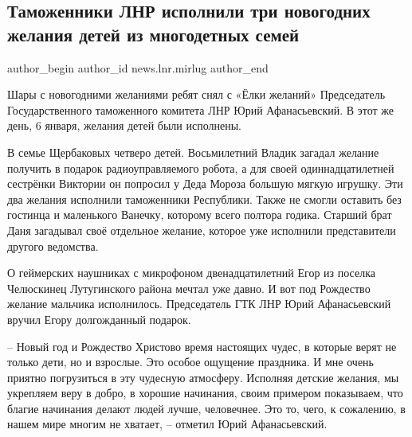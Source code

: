  
 
 
 
 
\subsection{Таможенники ЛНР исполнили три новогодних желания детей из многодетных семей}
\label{sec:06_01_2022.stz.news.lnr.mirlug.1.tamozhenniki_jolka_zhelanij}

\ifcmt
 author_begin
   author_id news.lnr.mirlug
 author_end
\fi

Шары с новогодними желаниями ребят снял с «Ёлки желаний» Председатель
Государственного таможенного комитета ЛНР Юрий Афанасьевский. В этот же день, 6
января, желания детей были исполнены.


В семье Щербаковых четверо детей. Восьмилетний Владик загадал желание получить
в подарок радиоуправляемого робота, а для своей одиннадцатилетней сестрёнки
Виктории он попросил у Деда Мороза большую мягкую игрушку. Эти два желания
исполнили таможенники Республики. Также не смогли оставить без гостинца и
маленького Ванечку, которому всего полтора годика. Старший брат Даня загадывал
своё отдельное желание, которое уже исполнили представители другого ведомства.



О геймерских наушниках с микрофоном двенадцатилетний Егор из поселка Челюскинец
Лутугинского района мечтал уже давно. И вот под Рождество желание мальчика
исполнилось. Председатель ГТК ЛНР Юрий Афанасьевский вручил Егору долгожданный
подарок.

– Новый год и Рождество Христово время настоящих чудес, в которые верят не
только дети, но и взрослые. Это особое ощущение праздника. И мне очень приятно
погрузиться в эту чудесную атмосферу. Исполняя детские желания, мы укрепляем
веру в добро, в хорошие начинания, своим примером показываем, что благие
начинания делают людей лучше, человечнее. Это то, чего, к сожалению, в нашем
мире многим не хватает, – отметил Юрий Афанасьевский.

